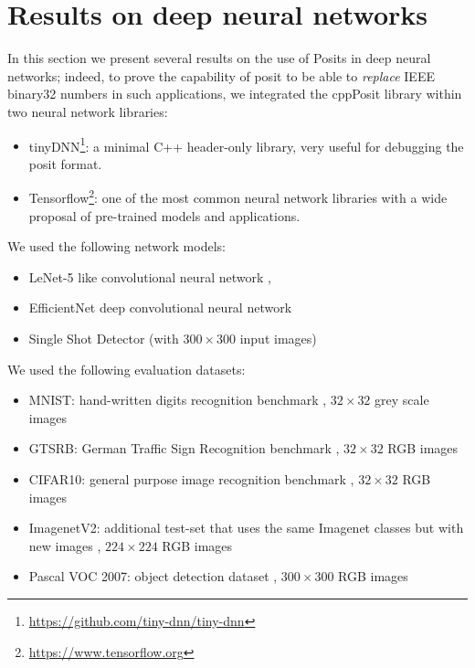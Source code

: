 \section{Results on deep neural networks}

In this section we present several results on the use of Posits in deep neural networks; indeed, to prove the capability of posit to be able to \textit{replace} IEEE binary32 numbers in such applications, we integrated the cppPosit library within two neural network libraries:
\begin{itemize}
    \item tinyDNN\footnote{\url{https://github.com/tiny-dnn/tiny-dnn}}: a minimal C++ header-only library, very useful for debugging the posit format.
    \item Tensorflow\footnote{\url{https://www.tensorflow.org}}: one of the most common neural network libraries with a wide proposal of pre-trained models and applications.
\end{itemize}

We used the following network models:
\begin{itemize}
    \item LeNet-5 like convolutional neural network \cite{lecunlenet}, \
    \item EfficientNet deep convolutional neural network \cite{tan2020efficientdet}
    \item Single Shot Detector (with $300\times 300$ input images) \cite{Liu_2016}
\end{itemize}

We used the following evaluation datasets:
\begin{itemize}
    \item MNIST: hand-written digits recognition benchmark \cite{lecun-mnisthandwrittendigit-2010}, $32\times32$ grey scale images
    \item GTSRB: German Traffic Sign Recognition benchmark \cite{stallkamp2011gtrsb}, $32\times32$ RGB images
    \item CIFAR10: general purpose image recognition benchmark \cite{Krizhevsky09learningmultiple}, $32\times32$ RGB images
    \item ImagenetV2: additional test-set that uses the same Imagenet classes but with new images \cite{recht2019imagenet}, $224\times224$ RGB images
    \item Pascal VOC 2007: object detection dataset \cite{pascal-voc-2007}, $300\times300$ RGB images
\end{itemize}


